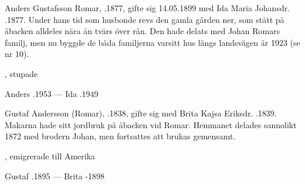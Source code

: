 Anders Gustafsson Romar, .1877, gifte sig 14.05.1899 med Ida Maria Johansdr. .1877. Under hans tid som husbonde revs den gamla gården ner, som stått på åbacken alldeles nära ån tvärs över rån. Den hade delats med Johan Romars familj, men nu byggde de båda familjerna varsitt hus längs landsvägen år 1923 (se nr 10).
\begin{jhchildren}
  \item {}
  \item {}
  \item {}
  \item {}, stupade
  \item {}
  \item {}
\end{jhchildren}

Anders .1953  ---  Ida .1949






Gustaf Andersson (Romar), .1838, gifte sig med Brita Kajsa Eriksdr. .1839. Makarna hade sitt jordbruk på åbacken vid Romar. Hemmanet delades sannolikt 1872 med brodern Johan, men fortsattes att brukas gemensamt.
\begin{jhchildren}
  \item {}, emigrerade till Amerika
  \item {}
  \item {}
\end{jhchildren}

Gustaf .1895  ---  Brita -1898



